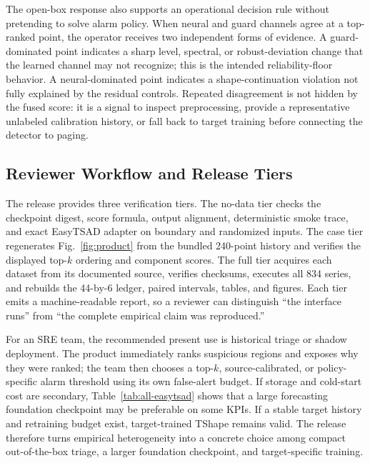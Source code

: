 The open-box response also supports an operational decision rule without pretending to solve alarm policy. When neural and guard channels agree at a top-ranked point, the operator receives two independent forms of evidence. A guard-dominated point indicates a sharp level, spectral, or robust-deviation change that the learned channel may not recognize; this is the intended reliability-floor behavior. A neural-dominated point indicates a shape-continuation violation not fully explained by the residual controls. Repeated disagreement is not hidden by the fused score: it is a signal to inspect preprocessing, provide a representative unlabeled calibration history, or fall back to target training before connecting the detector to paging.

\subsection{Reviewer Workflow and Release Tiers}

The release provides three verification tiers. The no-data tier checks the checkpoint digest, score formula, output alignment, deterministic smoke trace, and exact EasyTSAD adapter on boundary and randomized inputs. The case tier regenerates Fig.~\ref{fig:product} from the bundled 240-point history and verifies the displayed top-$k$ ordering and component scores. The full tier acquires each dataset from its documented source, verifies checksums, executes all 834 series, and rebuilds the 44-by-6 ledger, paired intervals, tables, and figures. Each tier emits a machine-readable report, so a reviewer can distinguish ``the interface runs'' from ``the complete empirical claim was reproduced.''

For an SRE team, the recommended present use is historical triage or shadow deployment. The product immediately ranks suspicious regions and exposes why they were ranked; the team then chooses a top-$k$, source-calibrated, or policy-specific alarm threshold using its own false-alert budget. If storage and cold-start cost are secondary, Table~\ref{tab:all-easytsad} shows that a large forecasting foundation checkpoint may be preferable on some KPIs. If a stable target history and retraining budget exist, target-trained TShape remains valid. The release therefore turns empirical heterogeneity into a concrete choice among compact out-of-the-box triage, a larger foundation checkpoint, and target-specific training.
